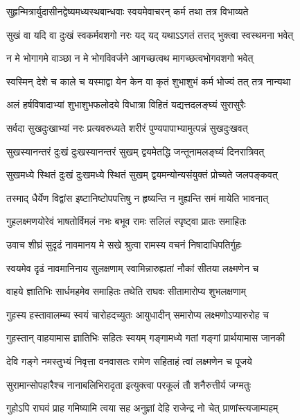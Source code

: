 \twolineshloka
{सुहृन्मित्रार्युदासीनद्वेष्यमध्यस्थबान्धवाः}
{स्वयमेवाचरन् कर्म तथा तत्र विभाव्यते} %

\twolineshloka
{सुखं वा यदि वा दुःखं स्वकर्मवशगो नरः}
{यद् यद् यथाऽऽगतं तत्तद् भुक्त्वा स्वस्थमना भवेत्} %

\twolineshloka
{न मे भोगागमे वाञ्छा न मे भोगविवर्जने}
{आगच्छत्वथ मागच्छत्वभोगवशगो भवेत्} %

\twolineshloka
{स्वस्मिन् देशे च काले च यस्माद्वा येन केन वा}
{कृतं शुभाशुभं कर्म भोज्यं तत् तत्र नान्यथा} %

\twolineshloka
{अलं हर्षविषादाभ्यां शुभाशुभफलोदये}
{विधात्रा विहितं यद्यत्तदलङ्घ्यं सुरासुरैः} %

\twolineshloka
{सर्वदा सुखदुःखाभ्यां नरः प्रत्यवरुध्यते}
{शरीरं पुण्यपापाभ्यामुत्पन्नं सुखदुःखवत्} %

\twolineshloka
{सुखस्यानन्तरं दुःखं दुःखस्यानन्तरं सुखम्}
{द्वयमेतद्धि जन्तूनामलङ्घ्यं दिनरात्रिवत्} %

\twolineshloka
{सुखमध्ये स्थितं दुःखं दुःखमध्ये स्थितं सुखम्}
{द्वयमन्योन्यसंयुक्तं प्रोच्यते जलपङ्कवत्} %

\twolineshloka
{तस्माद् धैर्येण विद्वांस इष्टानिष्टोपपत्तिषु}
{न हृष्यन्ति न मुह्यन्ति समं मायेति भावनात्} %

\twolineshloka
{गुहलक्ष्मणयोरेवं भाषतोर्विमलं नभः}
{बभूव रामः सलिलं स्पृष्ट्वा प्रातः समाहितः} %

\twolineshloka
{उवाच शीघ्रं सुदृढं नावमानय मे सखे}
{श्रुत्वा रामस्य वचनं निषादाधिपतिर्गुहः} %

\twolineshloka
{स्वयमेव दृढं नावमानिनाय सुलक्षणाम्}
{स्वामिन्नारुह्यतां नौकां सीतया लक्ष्मणेन च} %

\twolineshloka
{वाहये ज्ञातिभिः सार्धमहमेव समाहितः}
{तथेति राघवः सीतामारोप्य शुभलक्षणाम्} %

\twolineshloka
{गुहस्य हस्तावालम्ब्य स्वयं चारोहदच्युतः}
{आयुधादीन् समारोप्य लक्ष्मणोऽप्यारुरोह च} %

\twolineshloka
{गुहस्तान् वाहयामास ज्ञातिभिः सहितः स्वयम्}
{गङ्गामध्ये गतां गङ्गां प्रार्थयामास जानकी} %

\twolineshloka
{देवि गङ्गे नमस्तुभ्यं निवृत्ता वनवासतः}
{रामेण सहिताहं त्वां लक्ष्मणेन च पूजये} %

\twolineshloka
{सुरामान्सोपहारैश्च नानाबलिभिरादृता}
{इत्युक्त्वा परकूलं तौ शनैरुत्तीर्य जग्मतुः} %

\twolineshloka
{गुहोऽपि राघवं प्राह गमिष्यामि त्वया सह}
{अनुज्ञां देहि राजेन्द्र नो चेत् प्राणांस्त्यजाम्यहम्} %

